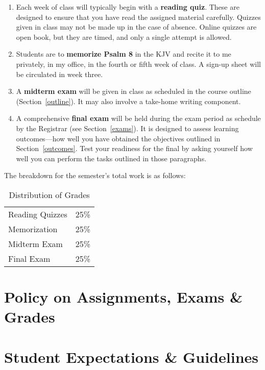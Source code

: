 \documentclass[titlepage]{article}
\begin{document}
\begin{enumerate}
 \item Each week of class will typically begin with a \textbf{reading
   quiz}. These are designed to ensure that you have read the assigned
   material carefully. Quizzes given in class may not be made up in the
   case of absence. Online quizzes are open book, but they are timed,
   and only a single attempt is allowed.
 \item Students are to \textbf{memorize Psalm 8} in the KJV and recite
   it to me privately, in my office, in the fourth or fifth week of
   class. A sign-up sheet will be circulated in week three.
 \item A \textbf{midterm exam} will be given in class as scheduled in
   the course outline (Section~\ref{outline}). It may also involve a
   take-home writing component.
 \item A comprehensive \textbf{final exam} will be held during the exam
   period as schedule by the Registrar (see Section~\ref{exams}). It is
   designed to assess learning outcomes---how well you have obtained the
   objectives outlined in Section~\ref{outcomes}. Test your readiness
   for the final by asking yourself how well you can perform the tasks
   outlined in those paragraphs.
\end{enumerate}

The breakdown for the semester's total work is as follows:

\begin{table}[htbp]
  \centering
  \begin{tabular}{lr}
    \toprule
    Reading Quizzes & 25\% \\
    Memorization    & 25\% \\
    Midterm Exam    & 25\% \\
    Final Exam      & 25\% \\
    \bottomrule
  \end{tabular}
  \caption{Distribution of Grades}
  \label{distribution}
\end{table}


\section{Policy on Assignments, Exams \& Grades}
\label{policy}






\section{Student Expectations \& Guidelines}
\label{expectations}
\end{document}
